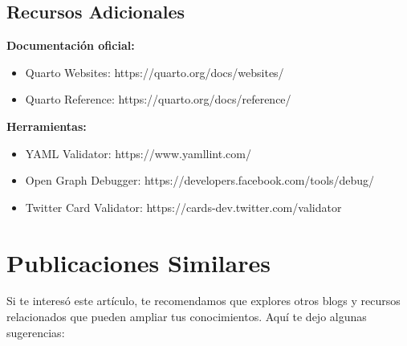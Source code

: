\documentclass[
  doc,
  floatsintext,
  longtable,
  a4paper,
  nolmodern,
  notxfonts,
  notimes,
  12pt,
  colorlinks=true,linkcolor=blue,citecolor=blue,urlcolor=blue]{apa7}
\providecommand{\tightlist}{%
  \setlength{\itemsep}{0pt}\setlength{\parskip}{0pt}}
\begin{document}
\subsection{Recursos Adicionales}\label{recursos-adicionales}

\textbf{Documentación oficial:}

\begin{itemize}
\tightlist
\item
  Quarto Websites: https://quarto.org/docs/websites/
\item
  Quarto Reference: https://quarto.org/docs/reference/
\end{itemize}

\textbf{Herramientas:}

\begin{itemize}
\tightlist
\item
  YAML Validator: https://www.yamllint.com/
\item
  Open Graph Debugger: https://developers.facebook.com/tools/debug/
\item
  Twitter Card Validator: https://cards-dev.twitter.com/validator
\end{itemize}

\section{Publicaciones Similares}\label{publicaciones-similares}

Si te interesó este artículo, te recomendamos que explores otros blogs y
recursos relacionados que pueden ampliar tus conocimientos. Aquí te dejo
algunas sugerencias:
\end{document}
